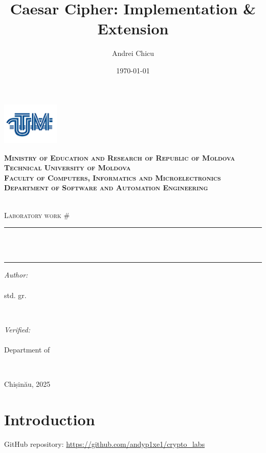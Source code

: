\documentclass[a4paper,12pt]{article}
\author{Andrei Chicu}
\date{\today}
\title{Caesar Cipher: Implementation \& Extension}
\begin{document}
\makeatletter
\begin{titlepage}
\centering

\includegraphics[height=2cm]{utm_logo.png}

\bfseries
\textsc{Ministry of Education and Research of Republic of Moldova} \\
\textsc{Technical University of Moldova} \\
\textsc{Faculty of Computers, Informatics and Microelectronics} \\
\textsc{Department of Software and Automation Engineering} \\
\mdseries

\vfill

\textsc{\Large \@labsubject} \\
\textsc{\large Laboratory work \#\@labno}\\[0.5cm]

\vspace{12pt}
\newcommand{\HRule}{\rule{\linewidth}{0.5mm}}
\HRule \\[0.2cm]
{ \LARGE \bfseries \@title }\\[0.4cm]
\HRule
\vfill

\begin{minipage}[t]{0.4\textwidth}
\begin{flushleft} \large
\emph{Author:} \\
\@author\\                        
std. gr. \@group
\end{flushleft}
\end{minipage}
~
\begin{minipage}[t]{0.4\textwidth}
\raggedleft \large
\emph{Verified:} \\
\@prof \\
Department of \textsc{\@profdep}
\end{minipage}\\[3cm]
\vfill

Chișinău, 2025
\end{titlepage}
\makeatother
\setcounter{page}{2}
\section{Introduction}
\label{sec:org6afa552}
GitHub repository: \url{https://github.com/andyp1xe1/crypto_labs}
\end{document}
